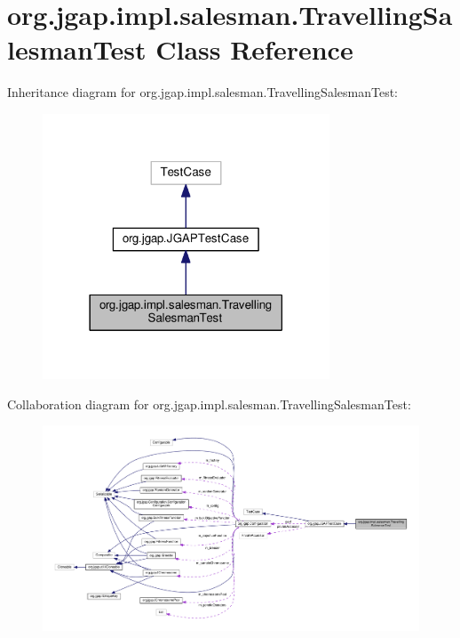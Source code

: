 \hypertarget{classorg_1_1jgap_1_1impl_1_1salesman_1_1_travelling_salesman_test}{\section{org.\-jgap.\-impl.\-salesman.\-Travelling\-Salesman\-Test Class Reference}
\label{classorg_1_1jgap_1_1impl_1_1salesman_1_1_travelling_salesman_test}
}


Inheritance diagram for org.\-jgap.\-impl.\-salesman.\-Travelling\-Salesman\-Test\-:
\nopagebreak
\begin{figure}[H]
\begin{center}
\leavevmode
\includegraphics[width=242pt]{classorg_1_1jgap_1_1impl_1_1salesman_1_1_travelling_salesman_test__inherit__graph}
\end{center}
\end{figure}


Collaboration diagram for org.\-jgap.\-impl.\-salesman.\-Travelling\-Salesman\-Test\-:
\nopagebreak
\begin{figure}[H]
\begin{center}
\leavevmode
\includegraphics[width=350pt]{classorg_1_1jgap_1_1impl_1_1salesman_1_1_travelling_salesman_test__coll__graph}
\end{center}
\end{figure}
